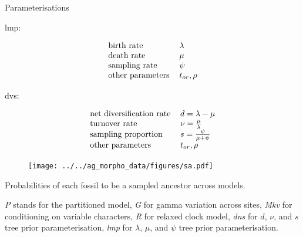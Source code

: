 \begin{frame}{Parameterisations}

\renewcommand{\arraystretch}{1.2}

lmp:

\color{newblue1} 

\begin{equation*} 
\begin{tabular}{ll} 
\text{birth rate} & $\lambda$  \\ 
\text{death rate} & $\mu$ \\ 
\text{sampling rate} & $\psi$  \\ 
\textcolor{black}{other parameters} & \textcolor{black}{$t_{or}, \rho$} \\
\end{tabular} \end{equation*}

\textcolor{black}{dvs:}

\begin{equation*} 
\begin{tabular}{ll} 
\text{net diversification rate} & $d = \lambda-\mu$  \\ 
\text{turnover rate} & $\turnover = \frac \mu \lambda$ \\ 
\text{\sampleprop} & $\fosp = \frac\psi {\mu + \psi}$  \\ 
\textcolor{black}{other parameters} & \textcolor{black}{$t_{or}, \rho$} \\
\end{tabular} \end{equation*}



\end{frame}




\begin{frame}
\begin{figure}
\texttt{[image: ../../ag\_morpho\_data/figures/sa.pdf]}
\label{saPostPr}
\end{figure}
\small{Probabilities of each fossil to be a sampled ancestor across models.

{\it P} stands for the partitioned model, {\it G} for gamma variation across sites, {\it Mkv} for conditioning on 
variable characters, {\it R} for relaxed clock model, {\it dns} for $d$, $\nu$, and $s$ tree prior parameterisation, {\it lmp} for $
\lambda$, $\mu$, and $\psi$ tree prior parameterisation.} 
\end{frame}

